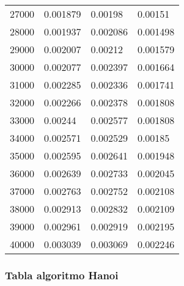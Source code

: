 \documentclass[a4paper, 11pt]{article}
\begin{document}
\begin{tabular}{@{}llll@{}}
27000         & 0.001879    & 0.00198  & 0.00151   \\
28000         & 0.001937    & 0.002086 & 0.001498  \\
29000         & 0.002007    & 0.00212  & 0.001579  \\
30000         & 0.002077    & 0.002397 & 0.001664  \\
31000         & 0.002285    & 0.002336 & 0.001741  \\
32000         & 0.002266    & 0.002378 & 0.001808  \\
33000         & 0.00244     & 0.002577 & 0.001808  \\
34000         & 0.002571    & 0.002529 & 0.00185   \\
35000         & 0.002595    & 0.002641 & 0.001948  \\
36000         & 0.002639    & 0.002733 & 0.002045  \\
37000         & 0.002763    & 0.002752 & 0.002108  \\
38000         & 0.002913    & 0.002832 & 0.002109  \\
39000         & 0.002961    & 0.002919 & 0.002195  \\
40000         & 0.003039    & 0.003069 & 0.002246  \\\bottomrule
\end{tabular}


\subsubsection{Tabla algoritmo Hanoi}
\end{document}
